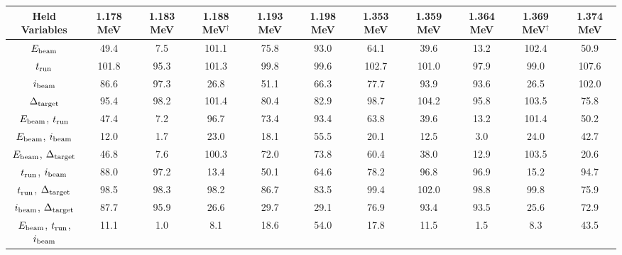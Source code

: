 \begin{landscape}
\begin{longtable}\small
    \begin{center}
        \caption{ACCEPTANCE BOUNDS WITH HELD VARIABLES, 95\,\%}
        \label{tab:acceptance-uncertainty-95}
        \begin{tabular}{cS[table-format=4.2]S[table-format=4.2]S[table-format=4.2]S[table-format=4.2]
        S[table-format=4.2]S[table-format=4.2]S[table-format=4.2]S[table-format=4.2]S[table-format=4.2]S[table-format=4.2]
        }
            \toprule
            \midrule
            \textbf{Held Variables} &
                \textbf{1.178 MeV} & \textbf{1.183 MeV} & \textbf{1.188 MeV}$^\dagger$ & \textbf{1.193 MeV} & \textbf{1.198 MeV} &
                \textbf{1.353 MeV} & \textbf{1.359 MeV} & \textbf{1.364 MeV} & \textbf{1.369 MeV}$^\dagger$ & \textbf{1.374 MeV} \\
            \midrule
$E_{\rm beam}$
    &  49.4 &   7.5 & 101.1 &  75.8 &  93.0 &  64.1 &  39.6 &  13.2 & 102.4 &  50.9 \\
$t_{\rm run}$
    & 101.8 &  95.3 & 101.3 &  99.8 &  99.6 & 102.7 & 101.0 &  97.9 &  99.0 & 107.6 \\
$i_{\rm beam}$
    &  86.6 &  97.3 &  26.8 &  51.1 &  66.3 &  77.7 &  93.9 &  93.6 &  26.5 & 102.0 \\
$\Delta_{\rm target}$
    &  95.4 &  98.2 & 101.4 &  80.4 &  82.9 &  98.7 & 104.2 &  95.8 & 103.5 &  75.8 \\
$E_{\rm beam}$, $t_{\rm run}$
    &  47.4 &   7.2 &  96.7 &  73.4 &  93.4 &  63.8 &  39.6 &  13.2 & 101.4 &  50.2 \\
$E_{\rm beam}$, $i_{\rm beam}$
    &  12.0 &   1.7 &  23.0 &  18.1 &  55.5 &  20.1 &  12.5 &   3.0 &  24.0 &  42.7 \\
$E_{\rm beam}$, $\Delta_{\rm target}$
    &  46.8 &   7.6 & 100.3 &  72.0 &  73.8 &  60.4 &  38.0 &  12.9 & 103.5 &  20.6 \\
$t_{\rm run}$, $i_{\rm beam}$
    &  88.0 &  97.2 &  13.4 &  50.1 &  64.6 &  78.2 &  96.8 &  96.9 &  15.2 &  94.7 \\
$t_{\rm run}$, $\Delta_{\rm target}$
    &  98.5 &  98.3 &  98.2 &  86.7 &  83.5 &  99.4 & 102.0 &  98.8 &  99.8 &  75.9 \\
$i_{\rm beam}$, $\Delta_{\rm target}$
    &  87.7 &  95.9 &  26.6 &  29.7 &  29.1 &  76.9 &  93.4 &  93.5 &  25.6 &  72.9 \\
$E_{\rm beam}$, $t_{\rm run}$, $i_{\rm beam}$
    &  11.1 &   1.0 &   8.1 &  18.6 &  54.0 &  17.8 &  11.5 &   1.5 &   8.3 &  43.5 \\

\end{tabular}
\end{center}
\end{longtable}
\end{landscape}
